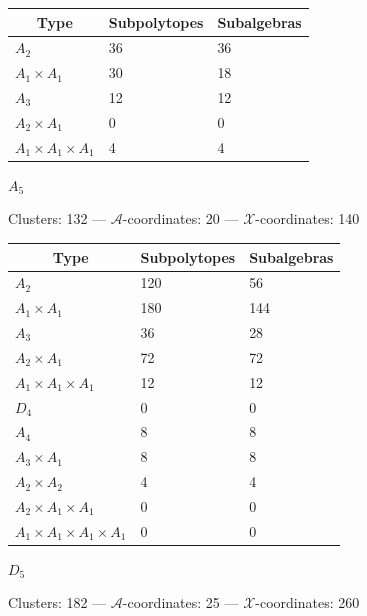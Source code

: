 \documentclass[12pt]{article}
\def\xcoords{$\mathcal{X}$-coordinates}
\def\acoords{$\mathcal{A}$-coordinates}
\begin{document}
\begin{center}
\begin{tabular}{ | l | l | l |}
\multicolumn{1}{c}{Type} &  \multicolumn{1}{c}{Subpolytopes}  &  \multicolumn{1}{c}{Subalgebras} \\
\hline \(A_2\) & 36 & 36 \\ 
\hline \(A_1 \times A_1\) & 30 & 18 \\ \hline 
\hline \(A_3\) & 12 & 12 \\ 
\hline \(A_2 \times A_1\) & 0 & 0 \\ 
\hline \(A_1 \times A_1 \times A_1\) & 4 & 4 \\ 
\hline
\end{tabular}

\newpage 

{ \qquad \qquad \Large{\(A_5\)} \hfill}

\vspace{.2cm}
\qquad Clusters: 132 \quad --- \quad \acoords: 20 \quad --- \quad \xcoords: 140 \hfill \\[1em]

\begin{tabular}{ | l | l | l |}
\multicolumn{1}{c}{Type} &  \multicolumn{1}{c}{Subpolytopes}  &  \multicolumn{1}{c}{Subalgebras} \\
\hline \(A_2\) & 120 & 56 \\ 
\hline \(A_1 \times A_1\) & 180 & 144 \\ \hline 
\hline \(A_3\) & 36 & 28 \\ 
\hline \(A_2 \times A_1\) & 72 & 72 \\ 
\hline \(A_1 \times A_1 \times A_1\) & 12 & 12 \\ \hline 
\hline \(D_4\) & 0 & 0 \\ 
\hline \(A_4\) & 8 & 8 \\ 
\hline \(A_3 \times A_1\) & 8 & 8 \\ 
\hline \(A_2 \times A_2\) & 4 & 4 \\ 
\hline \(A_2 \times A_1 \times A_1\) & 0 & 0 \\ 
\hline \(A_1 \times A_1 \times A_1 \times A_1\) & 0 & 0 \\ 
\hline
\end{tabular} 
\vspace{.5cm}

{ \qquad \qquad \Large{\(D_5\)} \hfill}

\vspace{.2cm}
\qquad Clusters: 182 \quad --- \quad \acoords: 25 \quad --- \quad \xcoords: 260 \hfill \\[1em]


\end{center}
\end{document}
